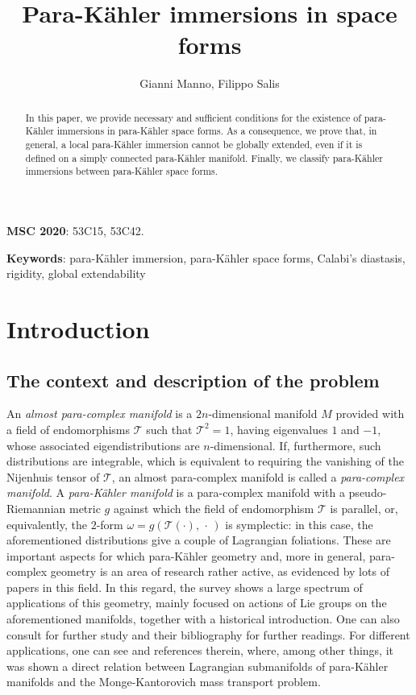 \documentclass{article}
\title{Para-K\"ahler immersions in \pk space forms} \author{Gianni Manno, Filippo Salis }
\newcommand{\pk}{para-K\"ahler }
\begin{document}
\maketitle

\begin{abstract}
In this paper, we provide necessary and sufficient conditions for the existence of \pk immersions in \pk space forms. As a consequence, we prove that, in general, a local \pk immersion cannot be globally extended, even if it is defined on a simply connected \pk manifold. Finally, we classify \pk immersions between \pk space forms.
\end{abstract}

\smallskip\noindent
\textbf{MSC 2020}: 53C15, 53C42.

\smallskip\noindent
\textbf{Keywords}: \pk immersion, \pk space forms, Calabi's diastasis, rigidity, global extendability


\section{Introduction}

\subsection{The context and description of the problem}
An \emph{almost para-complex manifold} is a $2n$-dimensional manifold $M$ provided with a field of endomorphisms $\mathcal{T}$ such that $\mathcal{T}^2=1$, having eigenvalues $1$ and $-1$, whose associated eigendistributions are $n$-dimensional. If, furthermore, such distributions are integrable, which is equivalent to requiring the vanishing of the Nijenhuis tensor of $\mathcal{T}$, an almost para-complex manifold is called a \emph{para-complex manifold}.  A \emph{\pk manifold} is a para-complex manifold with a pseudo-Riemannian metric $g$ against which the field of endomorphism $\mathcal{T}$ is parallel, or, equivalently, the $2$-form $\omega=g\left(\mathcal{T}(\cdot),\,\cdot\,\right)$ is symplectic: in this case, the aforementioned distributions give a couple of Lagrangian foliations. These are important aspects for which \pk geometry and, more in general, para-complex geometry is an area of research rather active,  as evidenced by lots of papers in this field. In this regard, the survey  \cite{gm}  shows a large spectrum of applications of this geometry, mainly focused on  actions of Lie groups on the aforementioned manifolds, together with a historical introduction. One can also consult  \cite{al,amt,amt2} for further study and their bibliography for further readings.
For different applications, one can see \cite{hl} and references therein, where, among other things, it was shown a direct relation between Lagrangian submanifolds of \pk manifolds  and the Monge-Kantorovich mass transport problem.
\end{document}
